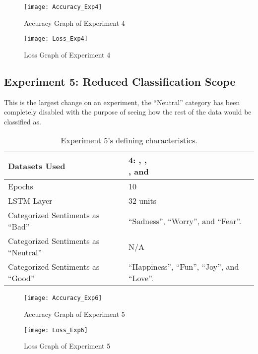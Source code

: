 \begin{figure}[!h]
	\centering
	\texttt{[image: Accuracy\_Exp4]}
	\caption{Accuracy Graph of Experiment 4}
	\label{fig:accuracy_exp4}
	\texttt{[image: Loss\_Exp4]}
	\caption{Loss Graph of Experiment 4}
	\label{fig:loss_exp4}
\end{figure}
\pagebreak

\subsection{Experiment 5: Reduced Classification Scope}
\label{exp6}
This is the largest change on an experiment, the ``Neutral'' category has been completely disabled with the purpose of seeing how the rest of the data would be classified as.
\begin{table}[!h]
	\caption{Experiment 5's defining characteristics.}
	\vspace{0.5cm}
	\centering
	\begin{tabular}[t]{|l|l|}
	\hline
		Datasets Used & \makecell{4: \citet{d1}, \citet{d2},\\ \citet{d3}, and \citet{d4}}
	\\ \hline
		Epochs & 10
	\\ \hline
		LSTM Layer & 32 units
	\\ \hline
		Categorized Sentiments as ``Bad'' & ``Sadness'', ``Worry'', and ``Fear''.
	\\ \hline	
		 Categorized Sentiments as ``Neutral'' & N/A
	\\ \hline	
		Categorized Sentiments as ``Good'' & ``Happiness'', ``Fun'', ``Joy'', and ``Love''.
	\\ \hline
	\end{tabular}
\end{table}

\begin{figure}[!h]
	\centering
	\texttt{[image: Accuracy\_Exp6]}
	\caption{Accuracy Graph of Experiment 5}
	\label{fig:accuracy_exp6}
	\texttt{[image: Loss\_Exp6]}
	\caption{Loss Graph of Experiment 5}
	\label{fig:loss_exp6}
\end{figure}
\pagebreak

